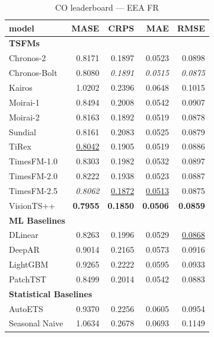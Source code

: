 \begin{table}[H]
\caption{CO leaderboard --- EEA FR}
\centering
\begin{small}
\begin{tabular}{lrrrr}
\toprule
model & MASE & CRPS & MAE & RMSE \\
\midrule
\multicolumn{5}{l}{\textbf{TSFMs}} \\
Chronos-2 & 0.8171 & 0.1897 & 0.0523 & 0.0898 \\
Chronos-Bolt & 0.8080 & \textit{0.1891} & \textit{0.0515} & \textit{0.0875} \\
Kairos & 1.0202 & 0.2396 & 0.0648 & 0.1015 \\
Moirai-1 & 0.8494 & 0.2008 & 0.0542 & 0.0907 \\
Moirai-2 & 0.8163 & 0.1892 & 0.0519 & 0.0878 \\
Sundial & 0.8161 & 0.2083 & 0.0525 & 0.0879 \\
TiRex & \underline{0.8042} & 0.1905 & 0.0519 & 0.0886 \\
TimesFM-1.0 & 0.8303 & 0.1982 & 0.0532 & 0.0897 \\
TimesFM-2.0 & 0.8222 & 0.1938 & 0.0523 & 0.0887 \\
TimesFM-2.5 & \textit{0.8062} & \underline{0.1872} & \underline{0.0513} & 0.0875 \\
VisionTS++ & \textbf{0.7955} & \textbf{0.1850} & \textbf{0.0506} & \textbf{0.0859} \\
\midrule
\multicolumn{5}{l}{\textbf{ML Baselines}} \\
DLinear & 0.8263 & 0.1996 & 0.0529 & \underline{0.0868} \\
DeepAR & 0.9014 & 0.2165 & 0.0573 & 0.0916 \\
LightGBM & 0.9265 & 0.2222 & 0.0595 & 0.0933 \\
PatchTST & 0.8499 & 0.2014 & 0.0542 & 0.0883 \\
\midrule
\multicolumn{5}{l}{\textbf{Statistical Baselines}} \\
AutoETS & 0.9370 & 0.2256 & 0.0605 & 0.0954 \\
Seasonal Naive & 1.0634 & 0.2678 & 0.0693 & 0.1149 \\
\bottomrule
\end{tabular}
\end{small}
\end{table}